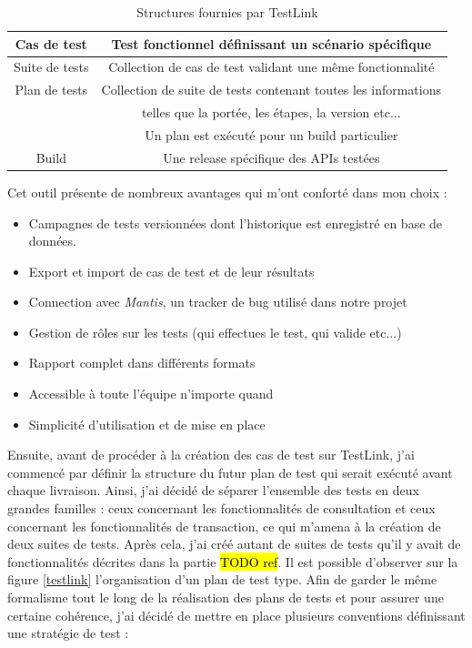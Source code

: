 \begin{table}[h!]
	\center
	\begin{tabular}{| c | c |}
     \hline
     Cas de test & Test fonctionnel définissant un scénario spécifique \\ \hline
     Suite de tests & Collection de cas de test validant une même fonctionnalité \\ \hline
     Plan de tests & Collection de suite de tests contenant toutes les informations \\  & telles que la portée, les étapes, la version etc...\\ & Un plan est exécuté pour un build particulier \\ \hline
     Build & Une release spécifique des APIs testées \\
     \hline
	\end{tabular}
	\caption{Structures fournies par TestLink}
	\label{structuresTestlink}
\end{table}

Cet outil présente de nombreux avantages qui m'ont conforté dans mon choix :
\begin{itemize}
	\item Campagnes de tests versionnées dont l'historique est enregistré en base de données.
	\item Export et import de cas de test et de leur résultats
	\item Connection avec \textit{Mantis}, un tracker de bug utilisé dans notre projet
	\item Gestion de rôles sur les tests (qui effectues le test, qui valide etc...)
	\item Rapport complet dans différents formats
	\item Accessible à toute l'équipe n'importe quand 
	\item Simplicité d'utilisation et de mise en place \\
\end{itemize}

	Ensuite, avant de procéder à la création des cas de test sur TestLink, j'ai commencé par définir la structure du futur plan de test qui serait exécuté avant chaque livraison. Ainsi, j'ai décidé de séparer l'ensemble des tests en deux grandes familles : ceux concernant les fonctionnalités de consultation et ceux concernant les fonctionnalités de transaction, ce qui m'amena à la création de deux suites de tests. Après cela, j'ai créé autant de suites de tests qu'il y avait de fonctionnalités décrites dans la partie \hl{TODO ref}. Il est possible d'observer sur la figure \ref{testlink} l'organisation d'un plan de test type. Afin de garder le même formalisme tout le long de la réalisation des plans de tests et pour assurer une certaine cohérence, j'ai décidé de mettre en place plusieurs conventions définissant une stratégie de test :
	
